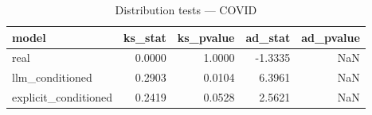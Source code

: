 \begin{table}
\caption{Distribution tests — COVID}
\label{tab:dist_COVID}
\begin{tabular}{lrrrr}
\toprule
model & ks\_stat & ks\_pvalue & ad\_stat & ad\_pvalue \\
\midrule
real & 0.0000 & 1.0000 & -1.3335 & NaN \\
llm\_conditioned & 0.2903 & 0.0104 & 6.3961 & NaN \\
explicit\_conditioned & 0.2419 & 0.0528 & 2.5621 & NaN \\
\bottomrule
\end{tabular}
\end{table}
